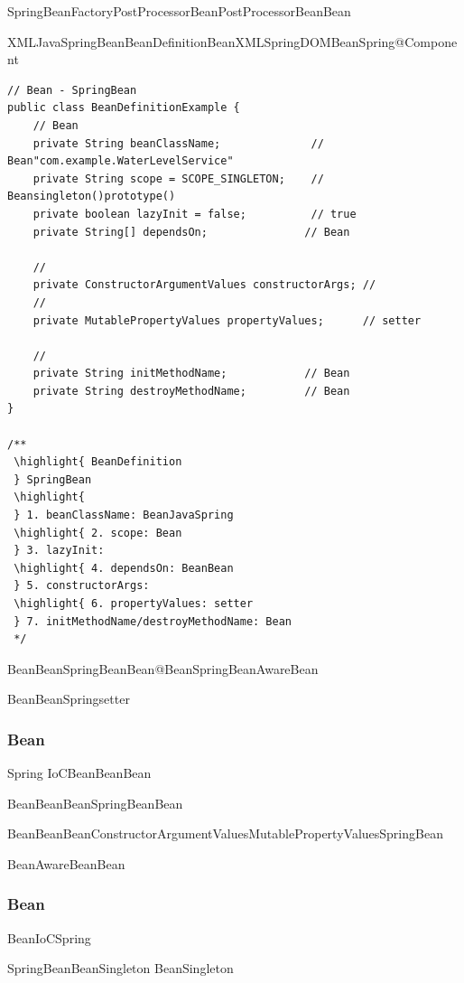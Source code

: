 \important{}SpringBeanFactoryPostProcessorBeanPostProcessorBeanBean

\important{}XMLJavaSpringBeanBeanDefinitionBeanXMLSpringDOMBeanSpring@Component

\begin{lstlisting}[style=java]
// Bean - SpringBean
public class BeanDefinitionExample {
    // Bean
    private String beanClassName;              // Bean"com.example.WaterLevelService"
    private String scope = SCOPE_SINGLETON;    // Beansingleton()prototype()
    private boolean lazyInit = false;          // true
    private String[] dependsOn;               // Bean
    
    // 
    private ConstructorArgumentValues constructorArgs; // 
    //   
    private MutablePropertyValues propertyValues;      // setter
    
    // 
    private String initMethodName;            // Bean
    private String destroyMethodName;         // Bean
}

/**
 \highlight{ BeanDefinition
 } SpringBean
 \highlight{ 
 } 1. beanClassName: BeanJavaSpring
 \highlight{ 2. scope: Bean
 } 3. lazyInit: 
 \highlight{ 4. dependsOn: BeanBean
 } 5. constructorArgs: 
 \highlight{ 6. propertyValues: setter
 } 7. initMethodName/destroyMethodName: Bean
 */
\end{lstlisting}

BeanBeanSpringBeanBean@BeanSpringBeanAwareBean

\important{}BeanBeanSpringsetter

\hypertarget{bean}{%
\subsubsection{Bean}\label{bean}}

Spring IoCBeanBeanBean

Bean\important{}BeanBeanSpringBeanBean

\important{}BeanBeanBeanConstructorArgumentValuesMutablePropertyValuesSpringBean

\important{}BeanAwareBeanBean

\hypertarget{bean-1}{%
\subsubsection{Bean}\label{bean-1}}

BeanIoCSpring

SpringBeanBeanSingleton BeanSingleton

